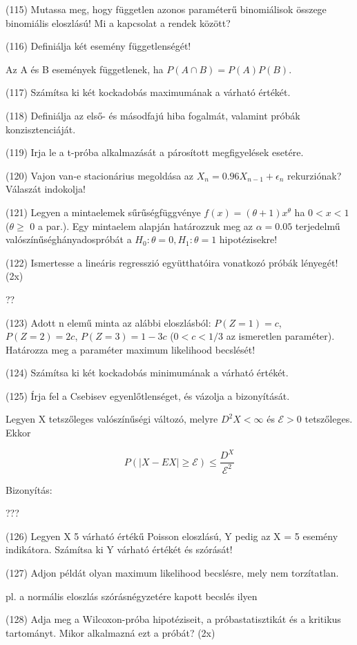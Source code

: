 \documentclass[12p]{article}
\begin{document}
(115) Mutassa meg, hogy független azonos paraméterű binomiálisok összege binomiális eloszlású! Mi a kapcsolat a rendek között?

(116) Definiálja két esemény függetlenségét!

Az A és B események függetlenek, ha $P(A \cap B) = P(A)P(B)$.

(117) Számítsa ki két kockadobás maximumának a várható értékét.

(118) Definiálja az első- és másodfajú hiba fogalmát, valamint próbák konzisztenciáját.

(119) Irja le a t-próba alkalmazását a párosított megfigyelések esetére.

(120) Vajon van-e stacionárius megoldása az $X_n = 0.96 X_{n-1} + \epsilon_n$ rekurziónak? Válaszát
indokolja!

(121) Legyen a mintaelemek sűrűségfüggvénye $f(x) = (\theta + 1)x^{\theta}$ ha $0 < x < 1$ ($\theta \geq$ 0 a par.).
Egy mintaelem alapján határozzuk meg az $\alpha = 0.05$ terjedelmű valószínűséghányadospróbát a $H_0 : \theta = 0, H_1 : \theta = 1$ hipotézisekre!

(122) Ismertesse a lineáris regresszió együtthatóira vonatkozó próbák lényegét! (2x)

??

(123) Adott n elemű minta az alábbi eloszlásból: $P(Z = 1) = c$, $P(Z = 2) = 2c$, $P(Z = 3) = 1 - 3c$ ($0 < c < 1/3$ az ismeretlen paraméter). Határozza meg a paraméter maximum likelihood becslését!

(124) Számítsa ki két kockadobás minimumának a várható értékét.

(125) Írja fel a Csebisev egyenlőtlenséget, és vázolja a bizonyítását.

Legyen X tetszőleges valószínűségi változó, melyre $D^2X < \infty$ és $\mathcal{E} > 0$ tetszőleges. Ekkor

$$P(|X - EX| \geq \mathcal{E}) \leq \frac{D^X}{\mathcal{E}^2}$$

Bizonyítás:

???

(126) Legyen X 5 várható értékű Poisson eloszlású, Y pedig az X = 5 esemény indikátora. Számítsa ki Y várható értékét és szórását!

(127) Adjon példát olyan maximum likelihood becslésre, mely nem torzítatlan.

pl. a normális eloszlás szórásnégyzetére kapott becslés ilyen

(128) Adja meg a Wilcoxon-próba hipotéziseit, a próbastatisztikát és a kritikus tartományt.
Mikor alkalmazná ezt a próbát? (2x)
\end{document}
